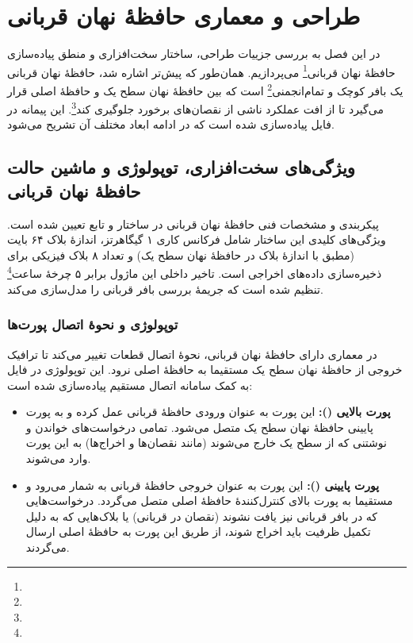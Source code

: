 \chapter{طراحی و معماری حافظهٔ نهان قربانی}

در این فصل به بررسی جزییات طراحی، ساختار سخت‌افزاری و منطق پیاده‌سازی حافظهٔ نهان قربانی\footnote{} می‌پردازیم. همان‌طور که پیش‌تر اشاره شد، حافظهٔ نهان قربانی یک بافر کوچک و تمام‌انجمنی\footnote{} است که بین حافظهٔ نهان سطح یک و حافظهٔ اصلی قرار می‌گیرد تا از افت عملکرد ناشی از نقصان‌های برخورد جلوگیری کند\footnote{}. این پیمانه در فایل  پیاده‌سازی شده است که در ادامه ابعاد مختلف آن تشریح می‌شود.\cite{jouppi1990, chang2015, wikipediaVictimCache}

\section{ویژگی‌های سخت‌افزاری، توپولوژی و ماشین حالت حافظهٔ نهان قربانی}

پیکربندی و مشخصات فنی حافظهٔ نهان قربانی در ساختار  و تابع  تعیین شده است. ویژگی‌های کلیدی این ساختار شامل فرکانس کاری ۱ گیگاهرتز، اندازهٔ بلاک ۶۴ بایت (مطبق با اندازهٔ بلاک در حافظهٔ نهان سطح یک) و تعداد ۸ بلاک فیزیکی برای ذخیره‌سازی داده‌های اخراجی است. تاخیر داخلی این ماژول برابر ۵ چرخهٔ ساعت\footnote{} تنظیم شده است که جریمهٔ بررسی بافر قربانی را مدل‌سازی می‌کند.

\subsection{توپولوژی و نحوهٔ اتصال پورت‌ها}

در معماری دارای حافظهٔ نهان قربانی، نحوهٔ اتصال قطعات تغییر می‌کند تا ترافیک خروجی از حافظهٔ نهان سطح یک مستقیما به حافظهٔ اصلی نرود. این توپولوژی در فایل  به کمک سامانه اتصال مستقیم پیاده‌سازی شده است:
\begin{itemize}
	\item \textbf{پورت بالایی ():} این پورت به عنوان ورودی حافظهٔ قربانی عمل کرده و به پورت پایینی حافظهٔ نهان سطح یک متصل می‌شود. تمامی درخواست‌های خواندن و نوشتنی که از سطح یک خارج می‌شوند (مانند نقصان‌ها و اخراج‌ها) به این پورت وارد می‌شوند.
	\item \textbf{پورت پایینی ():} این پورت به عنوان خروجی حافظهٔ قربانی به شمار می‌رود و مستقیما به پورت بالای کنترل‌کنندهٔ حافظهٔ اصلی متصل می‌گردد. درخواست‌هایی که در بافر قربانی نیز یافت نشوند (نقصان در قربانی) یا بلاک‌هایی که به دلیل تکمیل ظرفیت باید اخراج شوند، از طریق این پورت به حافظهٔ اصلی ارسال می‌گردند.
\end{itemize}

